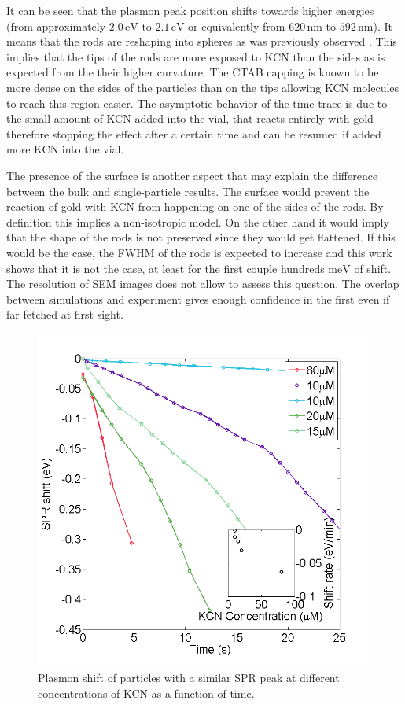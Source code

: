 \documentclass{article}
\begin{document}
It can be seen that the plasmon peak position shifts towards higher energies
(from approximately $2.0\,\textrm{eV}$ to $2.1\,\textrm{eV}$ or equivalently
from $620\,\textrm{nm}$ to $592\,\textrm{nm}$). It means that the rods are
reshaping into spheres as was previously observed \cite{Jana2002}. This implies
that the tips of the rods are more exposed to KCN than the sides as is expected
from the their higher curvature. The CTAB capping is known to be more dense on
the sides of the particles than on the tips allowing KCN molecules to reach this
region easier. The asymptotic behavior of the time-trace is due to the small
amount of KCN added into the vial, that reacts entirely with gold therefore
stopping the effect after a certain time and can be resumed if added more KCN
into the vial.

The presence of the surface is another aspect that may explain the difference
between the bulk and single-particle results. The surface would prevent the
reaction of gold with KCN from happening on one of the sides of the rods. By
definition this implies a non-isotropic model. On the other hand it would imply
that the shape of the rods is not preserved since they would get flattened. If
this would be the case, the FWHM of the rods is expected to increase and this
work shows that it is not the case, at least for the first couple
hundreds $\textrm{meV}$ of shift. The resolution of SEM images does not allow to
assess this question. The overlap between simulations and experiment gives
enough confidence in the first even if far fetched at first sight.

\begin{figure}[p]
 \centering
 \includegraphics[width=0.95\linewidth]{shift_different_concentrations.png}
 \caption{Plasmon shift of particles with a similar SPR peak at different
 concentrations of KCN as a function of time.}
 \label{fig:FWHM}
\end{figure}
\end{document}
